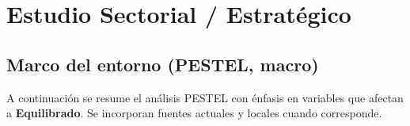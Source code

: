\section{Estudio Sectorial / Estratégico}


\subsection{Marco del entorno (PESTEL, macro)}
A continuación se resume el análisis PESTEL con énfasis en variables que afectan a \textbf{Equilibrado}. Se incorporan fuentes actuales y locales cuando corresponde.

